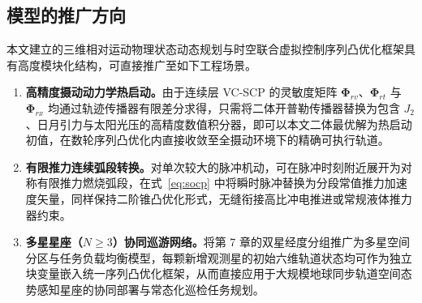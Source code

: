 \subsection{模型的推广方向}

本文建立的三维相对运动物理状态动态规划与时空联合虚拟控制序列凸优化框架具有高度模块化结构，可直接推广至如下工程场景。

\begin{enumerate}
  \item \textbf{高精度摄动动力学热启动。}由于连续层 VC-SCP 的灵敏度矩阵 $\bm\Phi_{rv}$、$\bm\Phi_{rt}$ 与 $\bm\Phi_{rx}$ 均通过轨迹传播器有限差分求得，只需将二体开普勒传播器替换为包含 $J_2$、日月引力与太阳光压的高精度数值积分器，即可以本文二体最优解为热启动初值，在数轮序列凸优化内直接收敛至全摄动环境下的精确可执行轨道。
  \item \textbf{有限推力连续弧段转换。}对单次较大的脉冲机动，可在脉冲时刻附近展开为对称有限推力燃烧弧段，在式~\eqref{eq:socp} 中将瞬时脉冲替换为分段常值推力加速度矢量，同样保持二阶锥凸优化形式，无缝衔接高比冲电推进或常规液体推力器约束。
  \item \textbf{多星星座（$N \ge 3$）协同巡游网络。}将第 7 章的双星经度分组推广为多星空间分区与任务负载均衡模型，每颗新增观测星的初始六维轨道状态均可作为独立块变量嵌入统一序列凸优化框架，从而直接应用于大规模地球同步轨道空间态势感知星座的协同部署与常态化巡检任务规划。
\end{enumerate}
